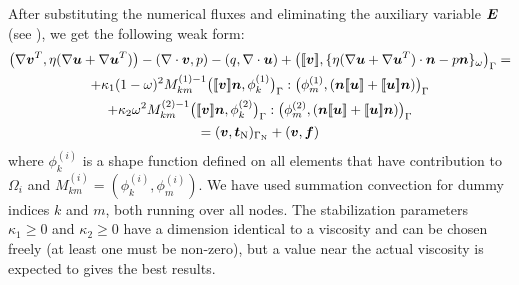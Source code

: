 After substituting the numerical fluxes and eliminating the auxiliary variable
$\boldsymbol{E}$ (see \cite{Choi11}), we get the following weak form:
\begin{multline}
  \big(\nabla\vek v^T,\eta(\nabla\vek u+\nabla\vek u^T)\big)
    -(\nabla\cdot\vek v,p)
    -(q,\nabla\cdot\vek u)
    +\big(\lj\vek v\rj,\{\eta(\nabla\vek u+\nabla\vek u^T)
         \cdot\vec n-p\vec n\}_\omega\big)_{\Gamma}=\\
 +\kappa_1(1-\omega)^2 M_{km}^{(1)-1}\big(\lj\vec v\rj\vec
n,\phi^{(1)}_k\big)_{\Gamma}:\big(\phi^{(1)}_m,(\vek n\lj\vec u\rj
+\lj\vec u\rj\vec n)\big)_{\Gamma}\\
 +\kappa_2\omega^2 M_{km}^{(2)-1}\big(\lj\vec v\rj\vec
n,\phi^{(2)}_k\big)_{\Gamma}:\big(\phi^{(2)}_m,(\vek n\lj\vec u\rj
+\lj\vec u\rj\vec n)\big)_{\Gamma}\\
=(\vek v,\vek t_{\text{N}})_{\Gamma_{\text{N}}}+(\vek v,\vek f)
   \label{eq:weakstokesinterface}
\end{multline}
where $\phi^{(i)}_k$ is a shape function defined on all elements that have
contribution to $\Omega_i$ and
$M^{(i)}_{km}=(\phi^{(i)}_k,\phi^{(i)}_m)$.
We have used summation convection for dummy indices $k$ and $m$,
both running over all nodes.
The stabilization parameters $\kappa_1\geq0$ and $\kappa_2\geq0$
have a dimension
identical to a viscosity and can be chosen freely (at least one
must be non-zero), but a value
near the actual
viscosity is expected to gives the best results.

